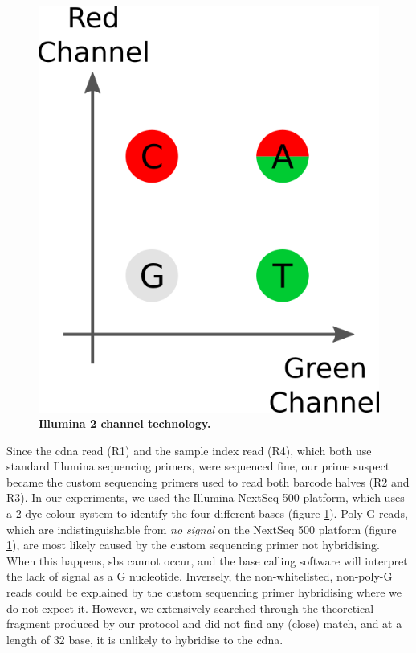 \begin{figure}
\centering
\includegraphics[width=\textwidth/3]{./ims/seq_2channel.png}
\caption[Illumina 2 channel technology]{\textbf{Illumina 2 channel technology.}}
\vspace{-20pt}
\label{fig:seq_2channel}
\end{figure}

Since the \acrshort{cdna} read (R1) and the sample index read (R4), which both use standard Illumina sequencing primers, were sequenced fine, our prime suspect became the custom sequencing primers used to read both barcode halves (R2 and R3). In our experiments, we used the Illumina NextSeq 500 platform, which uses a 2-dye colour system to identify the four different bases (figure \ref{fig:seq_2channel}). Poly-G reads, which are indistinguishable from \textit{no signal} on the NextSeq 500 platform (figure \ref{fig:seq_2channel}), are most likely caused by the custom sequencing primer not hybridising. When this happens, \acrlong{sbs} cannot occur, and the base calling software will interpret the lack of signal as a G nucleotide. Inversely, the non-whitelisted, non-poly-G reads could be explained by the custom sequencing primer hybridising where we do not expect it. However, we extensively searched through the theoretical fragment produced by our protocol and did not find any (close) match, and at a length of 32 base, it is unlikely to hybridise to the \acrshort{cdna}.\pms

